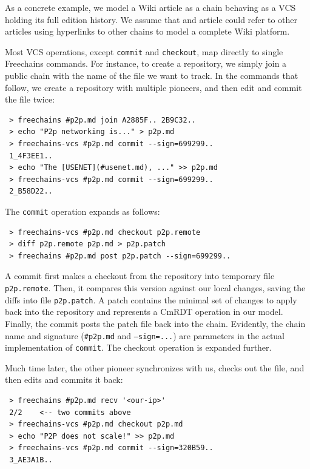 \documentclass[10pt,journal,compsoc]{IEEEtran}
\newcommand{\FC}       {Freechains\xspace}
\newcommand{\code}[1]  {\texttt{\footnotesize{#1}}}
\begin{document}
As a concrete example, we model a Wiki article as a chain behaving as a VCS
holding its full edition history.
We assume that and article could refer to other articles using hyperlinks to
other chains to model a complete Wiki platform.

Most VCS operations, except \code{commit} and \code{checkout}, map directly to
single \FC commands.
For instance, to create a repository, we simply join a public chain with the
name of the file we want to track.
In the commands that follow, we create a repository with multiple pioneers, and
then edit and commit the file twice:

{\footnotesize
\begin{verbatim}
 > freechains #p2p.md join A2885F.. 2B9C32..
 > echo "P2p networking is..." > p2p.md
 > freechains-vcs #p2p.md commit --sign=699299..
 1_4F3EE1..
 > echo "The [USENET](#usenet.md), ..." >> p2p.md
 > freechains-vcs #p2p.md commit --sign=699299..
 2_B58D22..
\end{verbatim}
}

The \code{commit} operation expands as follows:

{\footnotesize
\begin{verbatim}
 > freechains-vcs #p2p.md checkout p2p.remote
 > diff p2p.remote p2p.md > p2p.patch
 > freechains #p2p.md post p2p.patch --sign=699299..
\end{verbatim}
}

A commit first makes a checkout from the repository into temporary file
\code{p2p.remote}.
Then, it compares this version against our local changes, saving the diffs
into file \code{p2p.patch}.
A patch contains the minimal set of changes to apply back into the repository
and represents a CmRDT operation in our model.
Finally, the commit posts the patch file back into the chain.
Evidently, the chain name and signature (\code{\#p2p.md} and \code{--sign=...})
are parameters in the actual implementation of \code{commit}.
The checkout operation is expanded further.

Much time later, the other pioneer synchronizes with us, checks out the file,
and then edits and commits it back:

{\footnotesize
\begin{verbatim}
 > freechains #p2p.md recv '<our-ip>'
 2/2    <-- two commits above
 > freechains-vcs #p2p.md checkout p2p.md
 > echo "P2P does not scale!" >> p2p.md
 > freechains-vcs #p2p.md commit --sign=320B59..
 3_AE3A1B..
\end{verbatim}
}
\end{document}
